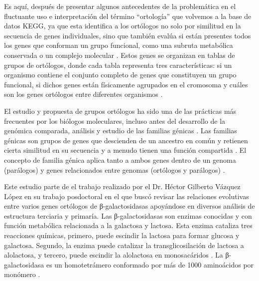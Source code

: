 Es aquí, después de presentar algunos antecedentes de la problemática en el fluctuante uso e interpretación del término ``ortología'' que volvemos a la base de datos KEGG, ya que esta identifica a los ortólogos no solo por similitud en la secuencia de genes individuales, sino que también evalúa si están presentes todos los genes que conforman un grupo funcional, como una subruta metabólica conservada o un complejo molecular \parencite{Kanehisa_Goto2000}. Estos genes se organizan en tablas de grupos de ortólogos, donde cada tabla representa tres características: si un organismo contiene el conjunto completo de genes que constituyen un grupo funcional, si dichos genes están físicamente agrupados en el cromosoma y cuáles son los genes ortólogos entre diferentes organismos \parencite{Kanehisa_Goto2000}.

El estudio y propuesta de grupos ortólogos ha sido una de las prácticas más frecuentes por los biólogos moleculares, incluso antes del desarrollo de la genómica comparada, análisis y estudio de las familias génicas \parencite{doctor}. Las familias génicas son grupos de genes que descienden de un ancestro en común y retienen cierta similitud en su secuencia y a menudo tienen una función compartida \parencite{Dayhoff_1976}. El concepto de  familia génica aplica tanto a ambos genes dentro de un genoma (parálogos) y genes relacionados entre genomas (ortólogos y parálogos) \parencite{Dayhoff_1976}.

Este estudio parte de el trabajo realizado por el Dr. Héctor Gilberto Vázquez López en su trabajo posdoctoral \parencite{doctor} en el que buscó revisar las relaciones evolutivas entre varios genes ortólogos de β-galactosidasas apoyándose en diversos análisis de estructura terciaria y primaría. Las β-galactosidasas son enzimas conocidas y con función metabólica relacionada a la galactosa y lactosa. Esta enzima cataliza tres reacciones químicas, primero, puede escindir la lactosa para formar glucosa y galactosa. Segundo, la enzima puede catalizar la transglicosilación de lactosa a alolactosa, y tercero, puede escindir la alolactosa en monosacáridos \parencite{Juers_2012}. La β-galactosidasa es un homotetrámero conformado por más de 1000 aminoácidos por monómero \parencite{Fowler_1978, Juers_2012}.


















